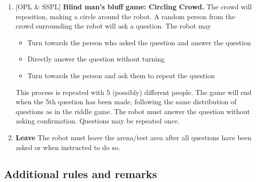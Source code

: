 \begin{enumerate}
    \setcounter{enumi}{\theenumTempSPR}
    \item {[OPL \& SSPL]} \textbf{Blind man's bluff game: Circling Crowd.} The crowd will reposition, making a circle around the robot. A random person from the crowd surrounding the robot will ask a question. The robot may
    \begin{itemize}
        \item Turn towards the person who asked the question and answer the question
        \item Directly answer the question without turning
        \item Turn towards the person and ask them to repeat the question
    \end{itemize}
    This process is repeated with 5 (possibly) different people. 
    The game will end when the 5th question has been made, following the same distribution of questions as in the riddle game. The robot must answer the question without asking confirmation. Questions may be repeated once.
    
    \item \textbf{Leave} The robot must leave the arena/test area after all questions have been asked or when instructed to do so.
\end{enumerate}

\subsection{Additional rules and remarks}

